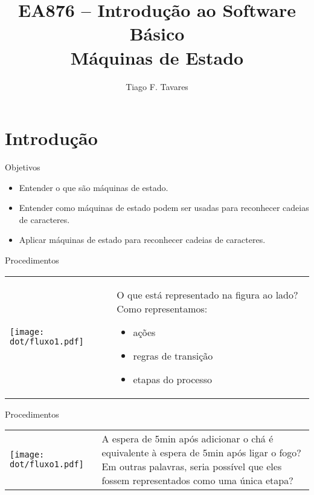 \documentclass{beamer}
\title[03-Arquiteturas]{EA876 -- Introdução ao Software Básico\\Máquinas de
Estado}
\author{Tiago F. Tavares}
\institute{FEEC -- UNICAMP}
\date{}
\begin{document}
\begin{frame}
  \titlepage
\end{frame}


\section{Introdução}

\begin{frame}{Objetivos}
  \Large
  \begin{itemize}
    \item Entender o que são máquinas de estado.
    \item Entender como máquinas de estado podem ser usadas para reconhecer
      cadeias de caracteres.
    \item Aplicar máquinas de estado para reconhecer cadeias de caracteres.
  \end{itemize}
\end{frame}

\begin{frame}{Procedimentos}
  \centering
  \begin{tabular}{l m{6cm}}
    \begin{minipage}{.3\textwidth}
  \texttt{[image: dot/fluxo1.pdf]}
    \end{minipage}
  &
  O que está representado na figura ao lado? Como representamos:
    \begin{itemize}
  \item ações
  \item regras de transição
  \item etapas do processo
    \end{itemize}
  \\
  \end{tabular}
\end{frame}

\begin{frame}{Procedimentos}
  \centering
  \Large
  \begin{tabular}{l m{6cm}}
    \begin{minipage}{.3\textwidth}
  \texttt{[image: dot/fluxo1.pdf]}
    \end{minipage}
  &
    A espera de 5min após adicionar o chá é equivalente à espera de 5min após
    ligar o fogo? Em outras palavras, seria possível que eles fossem
    representados como uma única etapa?
    \\
  \end{tabular}
\end{frame}
\end{document}

